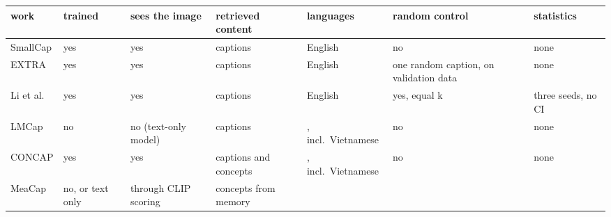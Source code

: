 \documentclass[manuscript,screen]{acmart}
\begin{document}
\begin{longtable}[]{@{}
  >{\raggedright\arraybackslash}p{}
  >{\raggedright\arraybackslash}p{}
  >{\raggedright\arraybackslash}p{}
  >{\raggedright\arraybackslash}p{}
  >{\raggedright\arraybackslash}p{}
  >{\raggedright\arraybackslash}p{}
  >{\raggedright\arraybackslash}p{}@{}}
\toprule\noalign{}
\begin{minipage}[b]{\linewidth}\raggedright
work
\end{minipage} & \begin{minipage}[b]{\linewidth}\raggedright
trained
\end{minipage} & \begin{minipage}[b]{\linewidth}\raggedright
sees the image
\end{minipage} & \begin{minipage}[b]{\linewidth}\raggedright
retrieved content
\end{minipage} & \begin{minipage}[b]{\linewidth}\raggedright
languages
\end{minipage} & \begin{minipage}[b]{\linewidth}\raggedright
random control
\end{minipage} & \begin{minipage}[b]{\linewidth}\raggedright
statistics
\end{minipage} \\
\midrule\noalign{}
\endhead
\bottomrule\noalign{}
\endlastfoot
SmallCap \citep{Ramos2023SmallCap} & yes & yes & captions & English & no & none \\
EXTRA \citep{Ramos2023EXTRA} & yes & yes & captions & English & one random caption, on validation
data & none \\
Li et al. \citep{Li2024RetrievalRobustness} & yes & yes & captions & English & yes, equal k & three
seeds, no CI \\
LMCap \citep{Ramos2023LMCap} & no & no (text-only model) & captions & 36, incl.~Vietnamese & no &
none \\
CONCAP \citep{Ibrahim2025CONCAP} & yes & yes & captions and concepts & 36, incl.~Vietnamese & no &
none \\
MeaCap \citep{Zeng2024MeaCap} & no, or text only & through CLIP scoring & concepts from memory

\end{longtable}
\end{document}
